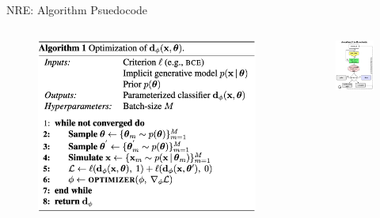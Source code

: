 \documentclass[12pt, aspectratio=169]{beamer}
\begin{document}
\begin{frame}{NRE: Algorithm Psuedocode}
    \begin{columns}
        \begin{column}{0.5\textwidth}
            \begin{figure}
                \centering
                \includegraphics[height=0.6\textheight]{"images/NRE_algo2.png"}
                \caption{\cite{hermans_likelihood-free_2020}}
            \end{figure}
        \end{column}

        \begin{column}{0.5\textwidth}
            \begin{figure}
                \centering
                \includegraphics[height=0.6\textheight]{"images/SNRE.png"}
                \caption{\cite{cranmer_frontier_2020}}
            \end{figure}
        \end{column}
    \end{columns}
\end{frame}
\end{document}
